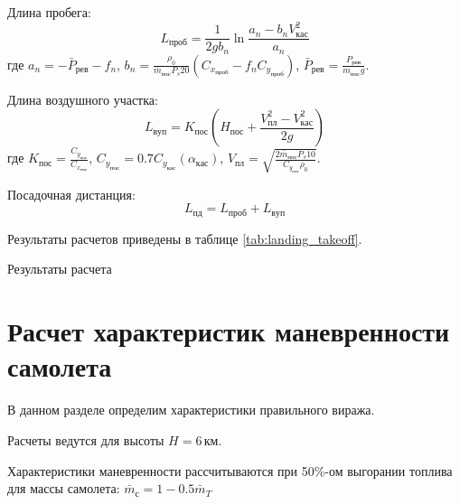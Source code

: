 Длина пробега:
\begin{equation}
    L_{проб} = \frac{1}{2g b_n} \ln{\frac{a_n - b_n V_{кас}^2}{a_n}}
\end{equation}
где $a_n = - \bar{P}_{рев} - f_n$, $b_n = \frac{\rho_0}{\bar{m}_{пос} P_s 20}
(C_{x_{проб}} - f_n C_{y_{проб}})$, $\bar{P}_{рев} = \frac{P_{рев}}{m_{пос} g}$.

Длина воздушного участка:
\begin{equation}
    L_{вуп} = K_{пос} \left( H_{пос} + \frac{V_{пл}^2 - V_{кас}^2}{2g} \right) 
\end{equation}
где $K_{пос} = \frac{C_{y_{пос}}}{C_{x_{пос}}}$, $C_{y_{пос}} = 0.7
C_{y_{кас}}(\alpha_{кас})$, $V_{пл} = \sqrt{\frac{2 \bar{m}_{пос} P_s 10
}{C_{y_{пос}} \rho_0}}$.

Посадочная дистанция:
\begin{equation}
    L_{пд} = L_{проб} + L_{вуп}
\end{equation}

Результаты расчетов приведены в таблице \ref{tab:landing_takeoff}. 

\begin{table}[H]
    \centering
    \caption{Результаты расчета}
    \label{tab:landing_takeoff}
    
\end{table}

\section{Расчет характеристик маневренности самолета}

В данном разделе определим характеристики правильного виража.

Расчеты ведутся для высоты $H=6\, \text{км}$.

Характеристики маневренности рассчитываются при 50\%-ом выгорании
топлива для массы самолета: $\bar{m}_с = 1 - 0.5 \bar{m}_T$

